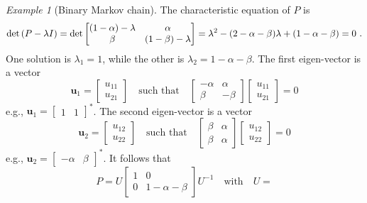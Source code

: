 \documentclass[12pt,a4paper]{amsart}
\theoremstyle{plain}%
\theoremstyle{definition}
\theoremstyle{remark}
\newtheorem{example}{Example}
\begin{document}
\begin{example}[Binary Markov chain]
The characteristic equation of $P$ is
\begin{equation*}
  \operatorname{det}\left(P - \lambda I\right) = \det
  \begin{bmatrix}
    (1 - \alpha) - \lambda & \alpha \\ \beta & (1-\beta) - \lambda 
  \end{bmatrix} = \lambda^2 - (2-\alpha-\beta)\lambda + (1-\alpha-\beta) = 0 \ .
\end{equation*}
One solution is $\lambda_1 = 1$, while the other is $\lambda_2 = 1 - \alpha - \beta$.
The first eigen-vector is a vector
\begin{equation*}
  \bm u_1 =
  \begin{bmatrix}
   u_{11} \\ u_{21}   
  \end{bmatrix}
\quad \text{such that} \quad 
  \begin{bmatrix}
  -\alpha & \alpha \\ \beta & -\beta 
\end{bmatrix}
\begin{bmatrix}
  u_{11} \\ u_{21}
\end{bmatrix} = 0
\end{equation*}
e.g., $\bm u_1 =
\begin{bmatrix}
  1 & 1
\end{bmatrix}^*$. The second eigen-vector is a vector
\begin{equation*}
  \bm u_2 =
  \begin{bmatrix}
   u_{12} \\ u_{22}   
  \end{bmatrix}
\quad \text{such that} \quad 
  \begin{bmatrix}
 \beta & \alpha \\ \beta & \alpha 
\end{bmatrix}
\begin{bmatrix}
  u_{12} \\ u_{22}
\end{bmatrix} = 0
\end{equation*}
e.g., $\bm u_2 =
\begin{bmatrix}
  -\alpha & \beta
\end{bmatrix}^*$. It follows that
\begin{equation*}
  P = U \begin{bmatrix} 1 & 0 \\ 0 & 1-\alpha-\beta
  \end{bmatrix} U^{-1} \quad \text{with} \quad U =

\end{equation*}
\end{example}
\end{document}
